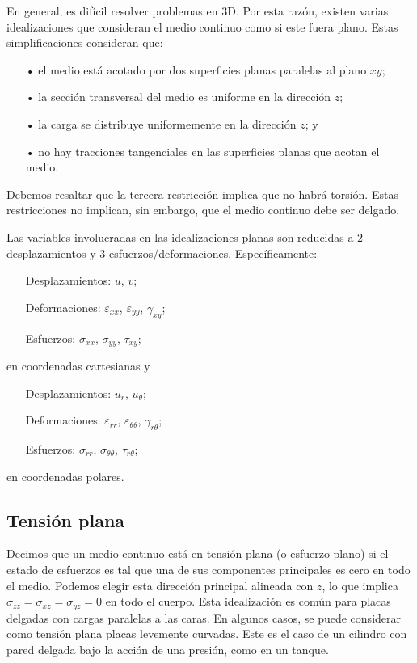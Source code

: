 \documentclass[../notas medios.tex]{subfiles}
\begin{document}
En general, es difícil resolver problemas en 3D. Por esta razón, existen varias idealizaciones que consideran el medio continuo como si este fuera plano. Estas simplificaciones consideran que:
\begin{itemize}
\item[•] el medio está acotado por dos superficies planas paralelas al plano \(xy\);
\item[•] la sección transversal del medio es uniforme en la dirección \(z\);
\item[•] la carga se distribuye uniformemente en la dirección \(z\); y
\item[•] no hay tracciones tangenciales en las superficies planas que acotan el medio.
\end{itemize}
Debemos resaltar que la tercera restricción implica que no habrá torsión. Estas restricciones no implican, sin embargo, que el medio continuo debe ser delgado.

Las variables involucradas en las idealizaciones planas son reducidas a 2 desplazamientos y 3 esfuerzos/deformaciones. Específicamente:
\begin{itemize}
\item[] Desplazamientos: \(u\), \(v\);
\item[] Deformaciones: \(\varepsilon_{xx}\), \(\varepsilon_{yy}\), \(\gamma_{xy}\); 
\item[] Esfuerzos: \(\sigma_{xx}\), \(\sigma_{yy}\), \(\tau_{xy}\);
\end{itemize}
en coordenadas cartesianas y
\begin{itemize}
\item[] Desplazamientos: \(u_r\), \(u_\theta\);
\item[] Deformaciones: \(\varepsilon_{rr}\), \(\varepsilon_{\theta\theta}\), \(\gamma_{r\theta}\); 
\item[] Esfuerzos: \(\sigma_{rr}\), \(\sigma_{\theta\theta}\), \(\tau_{r\theta}\);
\end{itemize}
en coordenadas polares.


\subsection{Tensión plana}
Decimos que un medio continuo está en tensión plana (o esfuerzo plano) si el estado de esfuerzos es tal que una de sus componentes principales es cero en todo el medio. Podemos elegir esta dirección principal alineada con \(z\), lo que implica \(\sigma_{zz}=\sigma_{xz}=\sigma_{yz}=0\) en todo el cuerpo. Esta idealización es común para placas delgadas con cargas paralelas a las caras. En algunos casos, se puede considerar como tensión plana placas levemente curvadas. Este es el caso de un cilindro con pared delgada bajo la acción de una presión, como en un tanque.
\end{document}
